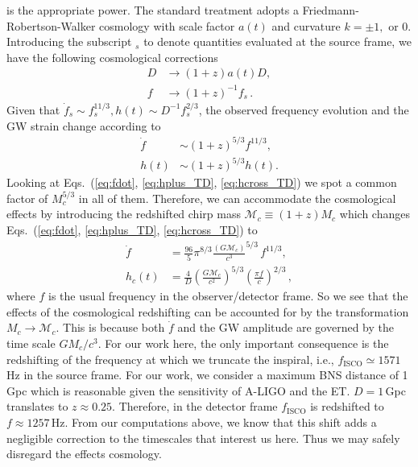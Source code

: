 \documentclass[11pt,a4paper]{article}
\newcommand{\f}{\frac}
\begin{document}
\begin{enumerate}
is the appropriate power. The standard treatment adopts a Friedmann-Robertson-Walker cosmology with scale factor $a(t)$ and curvature $k=\pm 1, \text{ or } 0$.
Introducing the subscript ${}_s$ to denote quantities evaluated at the source frame, we have the following cosmological corrections
%
\begin{align}
 D & \rightarrow  (1+z)a(t) D,\\
 f & \rightarrow (1+z)^{-1} f_s\, .
\end{align}
%
Given that $\dot{f}_s\sim f^{11/3}_s, h(t)\sim D^{-1} f_s^{2/3}$,
the observed frequency evolution and the GW strain change according to %
\begin{align}
\dot{f}\ \ &\sim (1+z)^{5/3}{f}^{11/3},\\
h(t) & \sim (1+z)^{5/3} h(t).
\end{align}
%
Looking at Eqs.~(\ref{eq:fdot}, \ref{eq:hplus_TD}, \ref{eq:hcross_TD}) we spot a common factor of $M_c^{5/3}$ in all of them.
Therefore, we can accommodate the cosmological effects by introducing the redshifted chirp mass $\mathcal{M}_c\equiv (1+z) M_c$
which changes Eqs.~(\ref{eq:fdot}, \ref{eq:hplus_TD}, \ref{eq:hcross_TD}) to
%
\begin{align}
\dot{f} &= \f{96}{5}\pi^{8/3} \f{(G \mathcal{M}_c)}{c^3}^{5/3}\, f^{11/3} \label{eq:fdot_redshifted},\\
h_c(t) & = \f{4}{D}\left(\f{G \mathcal{M}_c}{c^2}\right)^{5/3}\left(\frac{\pi f}{c}\right)^{2/3} \label{eq:strain_TD_redshifted}\, ,
\end{align}
%
where $f$ is the usual frequency in the observer/detector frame.
So we see that the effects of the cosmological redshifting can be accounted for by the transformation $M_c\rightarrow \mathcal{M}_c$.
This is because both $\dot{f}$ and the GW amplitude are governed by the time scale $G M_c/c^3$.
For our work here, the only important consequence is the redshifting of the frequency at which we truncate the inspiral, 
i.e., $f_\text{ISCO}\simeq 1571\,$Hz in the source frame.
For our work, we consider a maximum BNS distance of 1\,Gpc which is reasonable given the sensitivity
of A-LIGO and the ET. $D = 1\,$Gpc translates to $z \approx 0.25$.
Therefore, in the detector frame $f_\text{ISCO}$ is redshifted to $f \approx 1257\,$Hz. 
From our computations above, we know that this shift adds a negligible correction to the timescales that interest us here.
Thus we may safely disregard the effects cosmology.
%
\end{enumerate}
%
%
\end{document}
